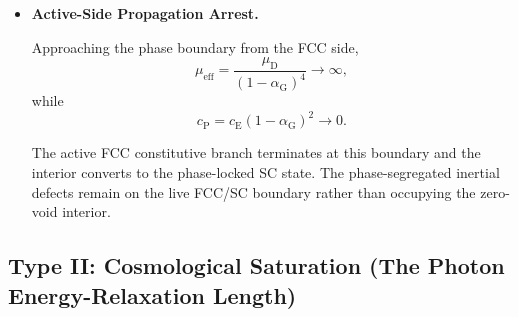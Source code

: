 \begin{itemize}
    The active vacuum FCC node phase boundary therefore reaches the same invariant specific-energy capacity $c_{\mathrm E}^2$ that governs the macroscopic saturation construction.

    \item \textbf{Active-Side Propagation Arrest.}

    Approaching the phase boundary from the FCC side,
    \begin{equation}
        \mu_{\mathrm{eff}}
        =
        \frac{
            \mu_{\mathrm D}
        }{
            (1-\alpha_{\mathrm G})^4
        }
        \longrightarrow
        \infty,
    \end{equation}
    while
    \begin{equation}
        c_{\mathrm P}
        =
        c_{\mathrm E}
        (1-\alpha_{\mathrm G})^2
        \longrightarrow
        0.
    \end{equation}

    The active FCC constitutive branch terminates at this boundary and the interior converts to the phase-locked SC state. The phase-segregated inertial defects remain on the live FCC/SC boundary rather than occupying the zero-void interior.

\end{itemize}


\subsection{Type II: Cosmological Saturation (The Photon Energy-Relaxation Length)}

